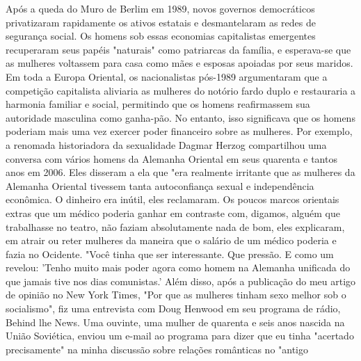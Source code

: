 Após a queda do Muro de Berlim em 1989, novos governos democráticos privatizaram rapidamente os ativos estatais e desmantelaram as redes de segurança social. Os homens sob essas economias capitalistas emergentes recuperaram seus papéis "naturais" como patriarcas da família, e esperava-se que as mulheres voltassem para casa como mães e esposas apoiadas por seus maridos. Em toda a Europa Oriental, os nacionalistas pós-1989 argumentaram que a competição capitalista aliviaria as mulheres do notório fardo duplo e restauraria a harmonia familiar e social, permitindo que os homens reafirmassem sua autoridade masculina como ganha-pão. No entanto, isso significava que os homens poderiam mais uma vez exercer poder financeiro sobre as mulheres. Por exemplo, a renomada historiadora da sexualidade Dagmar Herzog compartilhou uma conversa com vários homens da Alemanha Oriental em seus quarenta e tantos anos em 2006. Eles disseram a ela que "era realmente irritante que as mulheres da Alemanha Oriental tivessem tanta autoconfiança sexual e independência econômica. O dinheiro era inútil, eles reclamaram. Os poucos marcos orientais extras que um médico poderia ganhar em contraste com, digamos, alguém que trabalhasse no teatro, não faziam absolutamente nada de bom, eles explicaram, em atrair ou reter mulheres da maneira que o salário de um médico poderia e fazia no Ocidente. "Você tinha que ser interessante. Que pressão. E como um revelou: 'Tenho muito mais poder agora como homem na Alemanha unificada do que jamais tive nos dias comunistas.' Além disso, após a publicação do meu artigo de opinião no New York Times, "Por que as mulheres tinham sexo melhor sob o socialismo", fiz uma entrevista com Doug Henwood em seu programa de rádio, Behind lhe News. Uma ouvinte, uma mulher de quarenta e seis anos nascida na União Soviética, enviou um e-mail ao programa para dizer que eu tinha "acertado precisamente" na minha discussão sobre relações românticas no "antigo
 \par 

